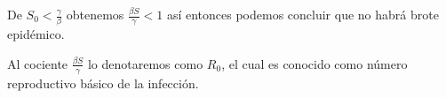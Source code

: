 \documentclass[a4paper,openright,12pt]{book}
\begin{document}
	\hfill \break
	
	De $S_{0} < \frac{\gamma}{\beta}$ obtenemos $\frac{\beta S}{\gamma}<1$
	así entonces podemos concluir que no habrá brote epidémico.
	\hfill \break
	
	Al cociente $\frac{\beta S}{\gamma}$ lo denotaremos como $R_{0}$, 
	el cual es conocido como número reproductivo básico de la infección.
	\nocite{keeling2011modeling}
	
	
	
	
	
\end{document}
